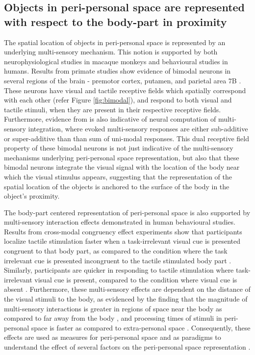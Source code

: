 \subsection{Objects in peri-personal space are represented with respect to the body-part in proximity}

The spatial location of objects in peri-personal space is represented by an underlying multi-sensory mechanism. This notion is supported by both neurophysiological studies in macaque monkeys and behavioural studies in humans. Results from primate studies show evidence of bimodal neurons in several regions of the brain - premotor cortex, putamen, and parietal area 7B \cite{graziano1994mapping}. These neurons have visual and tactile receptive fields which spatially correspond with each other (refer Figure \ref{fig:bimodal}), and respond to both visual and tactile stimuli, when they are present in their respective receptive fields.
Furthermore, evidence from  is also indicative of neural computation of multi-sensory integration, where evoked multi-sensory responses are either sub-additive or super-additive than than sum of uni-modal responses. This dual receptive field property of these bimodal neurons is not just indicative of the multi-sensory mechanisms underlying peri-personal space representation, but also that these bimodal neurons integrate the visual signal with the location of the body near which the visual stimulus appears, suggesting that the representation of the spatial location of the objects is anchored to the surface of the body in the object's proximity.

The body-part centered representation of peri-personal space is also supported by multi-sensory interaction effects demonstrated in human behavioural studies. Results from cross-modal congruency effect experiments show that participants localize tactile stimulation faster when a task-irrelevant visual cue is presented congruent to that body part, as compared to the condition where the task irrelevant cue is presented incongruent to the tactile stimulated body part \cite{spence2004multisensory}. Similarly, participants are quicker in responding to tactile stimulation where task-irrelevant visual cue is present, compared to the condition where visual cue is absent \cite{patane2019action}. Furthermore, these multi-sensory effects are dependent on the distance of the visual stimuli to the body, as evidenced by the finding that the magnitude of multi-sensory interactions is greater in regions of space near the body as compared to far away from the body \cite{spence2004spatial}, and processing times of stimuli in peri-personal space is faster as compared to extra-personal space \cite{iachini2014motor}. Consequently, these effects are used as measures for peri-personal space and as paradigms to understand the effect of several factors on the peri-personal space representation \cite{bufacchi2021peripersonal}.




